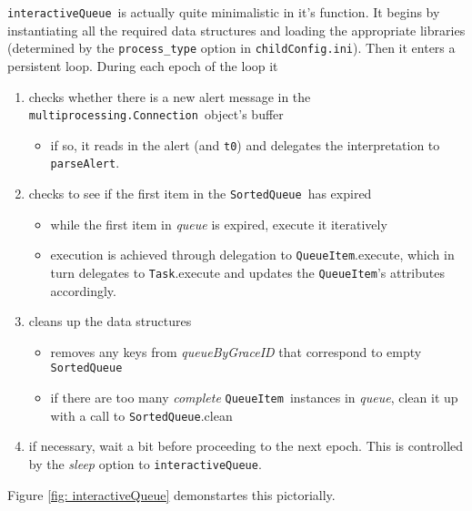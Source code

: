 \documentclass{article}
\newcommand{\multiprocessingConnection}{\texttt{multiprocessing.Connection}}
\newcommand{\interactiveQueue}{\texttt{interactiveQueue}}
\newcommand{\parseAlert}{\texttt{parseAlert}}
\newcommand{\SortedQueue}{\texttt{SortedQueue}}
\newcommand{\QueueItem}{\texttt{QueueItem}}
\newcommand{\Task}{\texttt{Task}}
\newcommand{\childConfigini}{\texttt{childConfig.ini}}
\begin{document}
\interactiveQueue~is actually quite minimalistic in it's function. 
It begins by instantiating all the required data structures and loading the appropriate libraries (determined by the \texttt{process\_type} option in \childConfigini).
Then it enters a persistent loop.
During each epoch of the loop it
\begin{enumerate}
    \item{checks whether there is a new alert message in the \multiprocessingConnection~object's buffer
        \begin{itemize}
            \item{if so, it reads in the alert (and \texttt{t0}) and delegates the interpretation to \parseAlert.}
        \end{itemize}
         }
    \item{checks to see if the first item in the \SortedQueue~has expired
        \begin{itemize}
            \item{while the first item in \textit{queue} is expired, execute it iteratively}
            \item{execution is achieved through delegation to \QueueItem.execute, which in turn delegates to \Task.execute and updates the \QueueItem's attributes accordingly.}
        \end{itemize}
         }
    \item{cleans up the data structures
        \begin{itemize}
            \item{removes any keys from \textit{queueByGraceID} that correspond to empty \SortedQueue}
            \item{if there are too many \textit{complete} \QueueItem~instances in \textit{queue}, clean it up with a call to \SortedQueue.clean}
        \end{itemize}
         }
    \item{if necessary, wait a bit before proceeding to the next epoch. This is controlled by the \textit{sleep} option to \interactiveQueue.}
\end{enumerate}
Figure \ref{fig: interactiveQueue} demonstartes this pictorially.
\end{document}
